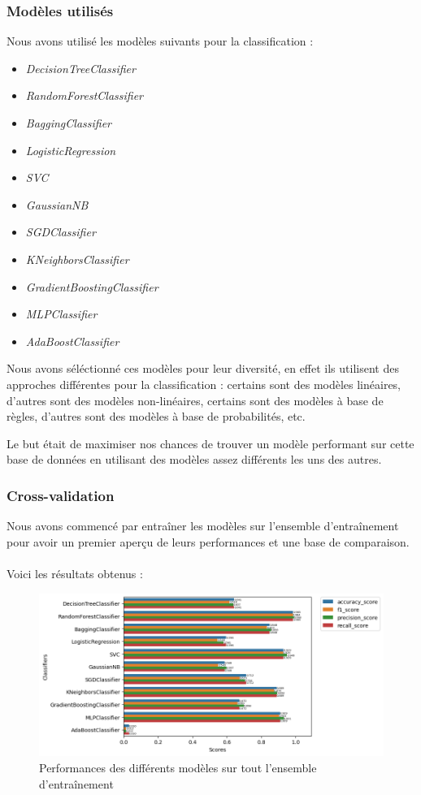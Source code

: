 \documentclass{article}
\begin{document}
\subsubsection{Modèles utilisés}
Nous avons utilisé les modèles suivants pour la classification :
\begin{itemize}
    \item \textit{DecisionTreeClassifier} \cite{DTC}
    \item \textit{RandomForestClassifier} \cite{RFC}
    \item \textit{BaggingClassifier} \cite{BC}
    \item \textit{LogisticRegression} \cite{LR}
    \item \textit{SVC} \cite{SVC}
    \item \textit{GaussianNB} \cite{GNB}
    \item \textit{SGDClassifier} \cite{SGD}
    \item \textit{KNeighborsClassifier} \cite{KNN}
    \item \textit{GradientBoostingClassifier} \cite{GNB}
    \item \textit{MLPClassifier} \cite{MLP}
    \item \textit{AdaBoostClassifier} \cite{ABC}
\end{itemize}

Nous avons séléctionné ces modèles pour leur diversité, en effet ils utilisent
des approches différentes pour la classification : certains sont des modèles linéaires,
d'autres sont des modèles non-linéaires, certains sont des modèles à base de règles,
d'autres sont des modèles à base de probabilités, etc. 

Le but était de maximiser nos chances de trouver un modèle performant sur cette
base de données en utilisant des modèles assez différents les uns des autres.

\subsubsection{Cross-validation}
Nous avons commencé par entraîner les modèles sur l'ensemble d'entraînement pour
avoir un premier aperçu de leurs performances et une base de comparaison.
\\\\
Voici les résultats obtenus :

\begin{figure}[h]
    \centering
    \includegraphics[width=1.2\textwidth]{img/all_perfs_without_cv.png}
    \caption{Performances des différents modèles sur tout l'ensemble d'entraînement}
\end{figure}
\end{document}
